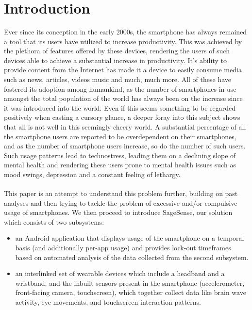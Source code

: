 \documentclass{article}
\begin{document}
\newpage


\section{Introduction}

\paragraph{} Ever since its conception in the early 2000s, the smartphone has always remained a tool that its users have utilized to increase productivity. This was achieved by the plethora of features offered by these devices, rendering the users of such devices able to achieve a substantial increase in productivity. It's ability to provide content from the Internet has made it a device to easily consume media such as news, articles, videos music and much, much more. All of these have fostered its adoption among humankind, as the number of smartphones in use amongst the total population of the world has always been on the increase since it was introduced into the world. Even if this seems something to be regarded positively when casting a cursory glance, a deeper foray into this subject shows that all is not well in this seemingly cheery world.\cite{lee2014dark} A substantial percentage of all the smartphone users are reported to be overdependent on their smartphones\cite{lopez2014prevalence, merlo2013measuring, lee2016dependency, davey2014assessment, eduardo2012mobile, koo2014risk}, and as the number of smartphone users increase, so do the number of such users. Such usage patterns lead to technostress\cite{brod1984technostress}, leading them on a declining slope of mental health and rendering these users prone to mental health issues such as mood swings, depression and a constant feeling of lethargy.\cite{van2015modeling, lee2013relationship, choi2012influence, wang2014studentlife}

\paragraph{} This paper is an attempt to understand this problem further, building on past analyses and then trying to tackle the problem of excessive and/or compulsive usage of smartphones. We then proceed to introduce SageSense, our solution which consists of two subsystems:

\begin{itemize}
    \item an Android application that displays usage of the smartphone on a temporal basis (and additionally per-app usage) and provides lock-out timeframes based on automated analysis of the data collected from the second subsystem.
    \item an interlinked set of wearable devices which include a headband and a wristband, and the inbuilt sensors present in the smartphone (accelerometer, front-facing camera, touchscreen), which together collect data like brain wave activity, eye movements, and touchscreen interaction patterns.
\end{itemize}
\end{document}
